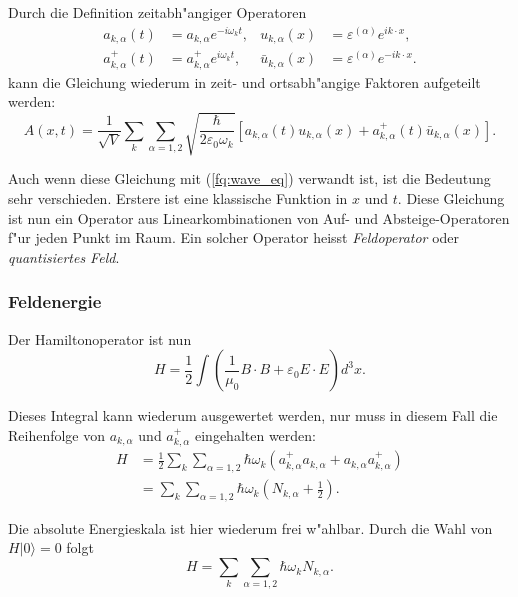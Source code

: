 \begin{refsection}
Durch die Definition zeitabh"angiger Operatoren
\begin{align*}
a_{k,\alpha}(t) &= a_{k,\alpha} e^{-i \omega_k t}, &
u_{k,\alpha}(x) &= \varepsilon^{(\alpha)} e^{ik \cdot x}, \\
a^+_{k,\alpha}(t) &= a^+_{k,\alpha} e^{i \omega_k t}, &
\bar{u}_{k,\alpha}(x) &= \varepsilon^{(\alpha)} e^{-ik \cdot x}.
\end{align*}
kann die Gleichung wiederum in zeit- und ortsabh"angige Faktoren aufgeteilt werden:
\begin{equation*}
A(x,t) = \frac{1}{\sqrt{V}} \sum_k \sum_{\alpha=1,2} \sqrt{\frac{\hbar}{2 \varepsilon_0 \omega_k}}\left[a_{k,\alpha}(t) u_{k,\alpha}(x) + a^+_{k,\alpha}(t) \bar{u}_{k,\alpha}(x) \right].
\end{equation*}

Auch wenn diese Gleichung mit (\ref{fq:wave_eq}) verwandt ist, ist die Bedeutung sehr verschieden. Erstere ist eine klassische Funktion in $x$ und $t$. Diese Gleichung ist nun ein Operator aus Linearkombinationen von Auf- und Absteige-Operatoren f"ur jeden Punkt im Raum. Ein solcher Operator heisst {\em Feldoperator} oder {\em quantisiertes Feld}.

\subsubsection{Feldenergie}
Der Hamiltonoperator ist nun
\begin{equation*}
H = \frac{1}{2} \int \left(\frac{1}{\mu_0} B \cdot B + \varepsilon_0 E \cdot E \right) d^3 x.
\end{equation*}

Dieses Integral kann wiederum ausgewertet werden, nur muss in diesem Fall die Reihenfolge von $a_{k,\alpha}$ und $a^+_{k,\alpha}$ eingehalten werden:
\begin{equation*}
\begin{split}
H &= \frac{1}{2} \sum_k \sum_{\alpha=1,2} \hbar \omega_k \left(a^+_{k,\alpha} a_{k,\alpha} + a_{k,\alpha} a^+_{k,\alpha}\right) \\
&= \sum_k \sum_{\alpha=1,2} \hbar \omega_k \left(N_{k,\alpha} + \frac{1}{2} \right).
\end{split}
\end{equation*}

Die absolute Energieskala ist hier wiederum frei w"ahlbar. Durch die Wahl von $H|0\rangle = 0$ folgt
\begin{equation*}
H = \sum_k \sum_{\alpha=1,2} \hbar \omega_k N_{k,\alpha}.
\end{equation*}


\end{refsection}
